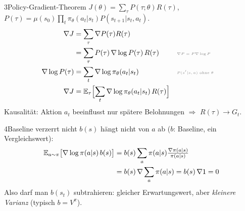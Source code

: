 \begin{hngrid}
\begin{hnp}[raster multicolumn=3,acc=hnnavy]{3}{Policy-Gradient-Theorem}
$J(\theta)=\sum_\tau P(\tau;\theta)R(\tau)$, $P(\tau)=\mu(s_0)\prod_t\pi_\theta(a_t|s_t)P(s_{t+1}|s_t,a_t)$.
\begin{align*}
\nabla J&=\sum_\tau\nabla P(\tau)R(\tau)\\&=\sum_\tau P(\tau)\,\nabla\log P(\tau)\,R(\tau)&&\why{$\nabla P=P\nabla\log P$}\\
\nabla\log P(\tau)&=\sum_t\nabla\log\pi_\theta(a_t|s_t)&&\why{$P(s'|s,a)$ ohne $\theta$}\\
\nabla J&=\E_\tau\Bigl[\sum_t\nabla\log\pi_\theta(a_t|s_t)\,R(\tau)\Bigr]
\end{align*}
Kausalität: Aktion $a_t$ beeinflusst nur spätere Belohnungen $\Rightarrow$ $R(\tau)\to G_t$.
\end{hnp}
%
\begin{hnp}[raster multicolumn=3,acc=hngreen]{4}{Baseline verzerrt nicht}
$b(s)$ hängt nicht von $a$ ab ($b$: Baseline, ein Vergleichswert):
\begin{align*}
\mathbb{E}_{a\sim\pi}\bigl[\nabla\log\pi(a|s)\,b(s)\bigr]&=b(s)\sum_a\pi(a|s)\tfrac{\nabla\pi(a|s)}{\pi(a|s)}\\
&=b(s)\,\nabla\sum_a\pi(a|s)=b(s)\,\nabla1=0
\end{align*}
Also darf man $b(s_t)$ subtrahieren: gleicher Erwartungswert, aber \emph{kleinere Varianz} (typisch $b=V^\pi$).
\end{hnp}
%
\end{hngrid}
